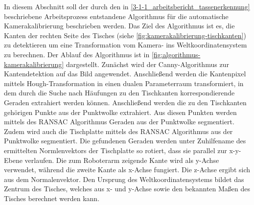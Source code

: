 In diesem Abschnitt soll der durch den in \ref{3-1-1_arbeitsbericht_tassenerkennung} beschriebene Arbeitsprozess entstandene Algorithmus für die automatische Kamerakalibrierung beschrieben werden. Das Ziel des Algorithmus ist es, die Kanten der rechten Seite des Tisches (siehe \ref{fig:kamerakalibrierung-tischkanten}) zu detektieren um eine Transformation vom Kamera- ins Weltkoordinatensystem zu berechnen. Der Ablauf des Algorithmus ist in \ref{fig:algorithmus-kamerakalibrierung} dargestellt. Zunächst wird der Canny-Algorithmus zur Kantendetektion auf das Bild angewendet. Anschließend werden die Kantenpixel mittels Hough-Transformation in einen dualen Parameterraum transformiert, in dem durch die Suche nach Häufungen zu den Tischkanten korrespondierende Geraden extrahiert werden können. Anschließend werden die zu den Tischkanten gehörigen Punkte aus der Punktwolke extrahiert. Aus diesen Punkten werden mittels des RANSAC Algorithmus Geraden aus der Punktwolke segmentiert. Zudem wird auch die Tischplatte mittels des RANSAC Algorithmus aus der Punktwolke segmentiert. Die gefundenen Geraden werden unter Zuhilfename des ermittelten Normlenvektors der Tischplatte so rotiert, dass sie parallel zur x-y-Ebene verlaufen. Die zum Roboterarm zeigende Kante wird als y-Achse verwendet, während die zweite Kante als x-Achse fungiert. Die z-Achse ergibt sich aus dem Normalenvektor. Den Ursprung des Weltkoordinatensystems bildet das Zentrum des Tisches, welches aus x- und y-Achse sowie den bekannten Maßen des Tisches berechnet werden kann.